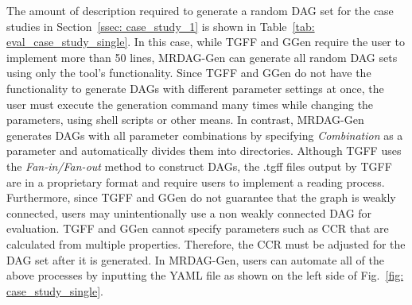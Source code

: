 The amount of description required to generate a random DAG set for the case studies in Section~\ref{ssec: case_study_1} is shown in Table~\ref{tab: eval_case_study_single}.
In this case, while TGFF and GGen require the user to implement more than 50 lines, MRDAG-Gen can generate all random DAG sets using only the tool's functionality.
Since TGFF and GGen do not have the functionality to generate DAGs with different parameter settings at once, the user must execute the generation command many times while changing the parameters, using shell scripts or other means.
In contrast, MRDAG-Gen generates DAGs with all parameter combinations by specifying {\it Combination} as a parameter and automatically divides them into directories.
Although TGFF uses the {\it Fan-in/Fan-out} method to construct DAGs, the .tgff files output by TGFF are in a proprietary format and require users to implement a reading process.
Furthermore, since TGFF and GGen do not guarantee that the graph is weakly connected, users may unintentionally use a non weakly connected DAG for evaluation.
TGFF and GGen cannot specify parameters such as CCR that are calculated from multiple properties. Therefore, the CCR must be adjusted for the DAG set after it is generated.
In MRDAG-Gen, users can automate all of the above processes by inputting the YAML file as shown on the left side of Fig.~\ref{fig: case_study_single}.


\begin{table}[tb]
    \centering
    \caption{Effort required to generate random DAG sets \\ for {\it Case Study 2} \cite{he2021response, gunzel2021suspension, ueter2021hard}}
    \label{tab: eval_case_study_all_timer}
    \renewcommand{\arraystretch}{1.2}
\end{table}


